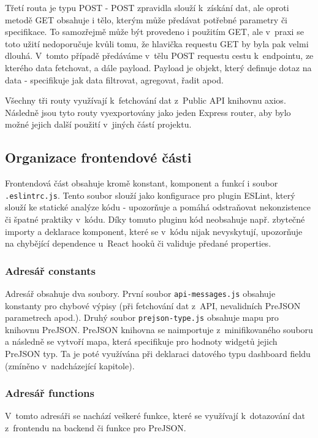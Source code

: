 \documentclass[czech, bc, kiv, he, iso690numb]{fasthesis}
\begin{document}
Třetí routa je typu POST - POST zpravidla slouží k~získání dat, ale oproti metodě GET obsahuje i tělo, kterým může předávat potřebné parametry či specifikace. To samozřejmě může být provedeno i
použitím GET, ale v~praxi se toto užití nedoporučuje kvůli tomu, že hlavička requestu GET by byla pak velmi dlouhá. V~tomto případě předáváme v~tělu POST requestu cestu k~endpointu, ze kterého data
fetchovat, a dále payload. Payload je objekt, který definuje dotaz na data - specifikuje jak data filtrovat, agregovat, řadit apod. 

Všechny tři routy využívají k~fetchování dat z~Public API knihovnu axios. Následně jsou tyto routy vyexportovány jako jeden Express router, aby bylo možné jejich další použití v~jiných částí projektu.

\subsection{Organizace frontendové části}

Frontendová část obsahuje kromě konstant, komponent a funkcí i soubor \texttt{.eslintrc.js}. Tento soubor slouží jako konfigurace pro plugin ESLint, který slouží ke statické analýze
kódu - upozorňuje a pomáhá odstraňovat nekonzistence či špatné praktiky v~kódu. Díky tomuto pluginu kód neobsahuje např. zbytečné importy a deklarace komponent, které se v~kódu nijak nevyskytují,
upozorňuje na chybějící dependence u~React hooků či validuje předané properties.

\subsubsection{Adresář constants}

Adresář obsahuje dva soubory. První soubor \texttt{api-messages.js} obsahuje konstanty pro chybové výpisy (při fetchování dat z~API, nevalidních PreJSON parametrech apod.).
Druhý soubor \texttt{prejson-type.js} obsahuje mapu pro knihovnu PreJSON. PreJSON knihovna se naimportuje z~minifikovaného souboru a následně se vytvoří mapa, která specifikuje
pro hodnoty widgetů jejich PreJSON typ. Ta je poté využívána při deklaraci datového typu dashboard fieldu (zmíněno v~nadcházející kapitole).

\subsubsection{Adresář functions}

V~tomto adresáři se nachází veškeré funkce, které se využívají k~dotazování dat z~frontendu na backend či funkce pro PreJSON.
\end{document}
